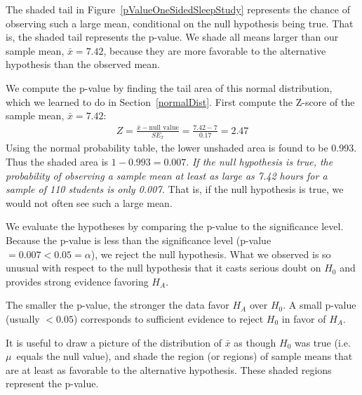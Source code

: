 The shaded tail in Figure~\ref{pValueOneSidedSleepStudy} represents the chance of observing such a large mean, conditional on the null hypothesis being true. That is, the shaded tail represents the \mbox{p-value}. We shade all means larger than our sample mean, $\bar{x} = 7.42$, because they are more favorable to the alternative hypothesis than the observed mean.

We compute the p-value by finding the tail area of this normal distribution, which we learned to do in Section~\ref{normalDist}. First compute the Z-score of the sample mean, $\bar{x} = 7.42$:
\begin{eqnarray*}
Z = \frac{\bar{x} - \text{null value}}{SE_{\bar{x}}} = \frac{7.42 - 7}{0.17} = 2.47
\end{eqnarray*}
Using the normal probability table, the lower unshaded area is found to be 0.993. Thus the shaded area is $1-0.993 = 0.007$. {\em If the null hypothesis is true, the probability of observing a sample mean at least as large as 7.42 hours for a sample of 110 students is only 0.007.} That is, if the null hypothesis is true, we would not often see such a large mean.

We evaluate the hypotheses by comparing the p-value to the significance level. Because the p-value is less than the significance level (p-value $=0.007 < 0.05=\alpha$), we reject the null hypothesis. What we observed is so unusual with respect to the null hypothesis that it casts serious doubt on $H_0$ and provides strong evidence favoring $H_A$.

\begin{termBox}{
The smaller the p-value, the stronger the data favor $H_A$ over $H_0$. A small p-value (usually $<0.05$) corresponds to sufficient evidence to reject $H_0$ in favor of $H_A$.}
\end{termBox}

\begin{tipBox}{
It is useful to draw a picture of the distribution of $\bar{x}$ as though $H_0$ was true (i.e.~$\mu$~equals the null value), and shade the region (or regions) of sample means that are at least as favorable to the alternative hypothesis. These shaded regions represent the p-value.}
\end{tipBox}


